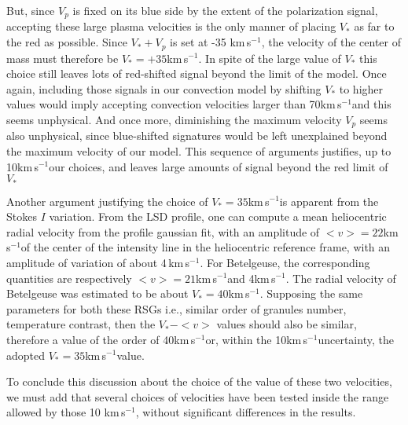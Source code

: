 \documentclass{/Users/art2/TeX/aanda/aa}
\def\kms {km\,s$^{-1}$}
\begin{document}
But, since $V_p$ is fixed on its blue side by the extent of the polarization signal, accepting these large plasma velocities is the only manner of placing $V_*$  as far to the red as possible.
Since $V_*+V_p$ is set at -35 \kms,  the velocity of the center of mass must therefore be  $V_*=+35$\kms.  
In spite of the large value of $V_*$ this choice  still leaves lots of red-shifted signal beyond the limit of the model. Once again, including those signals in our convection model by shifting $V_*$ to higher values would imply accepting convection velocities larger than 70\kms and this seems unphysical. And once more, diminishing the maximum velocity $V_p$ seems also unphysical, since blue-shifted signatures would be left unexplained beyond the maximum velocity of our model. This sequence of arguments justifies, up to 10\kms our choices, and leaves large amounts of signal beyond the red limit of $V_*$
 
 Another argument justifying the choice of  $V_*=35$\kms is apparent from  the Stokes $I$ variation.
From the LSD profile, one can compute a mean heliocentric radial velocity from the profile gaussian fit, with an amplitude of $<v>=22$\kms of the center of the intensity line in the heliocentric reference frame, with an amplitude of variation of about 4\,km\,s$^{-1}$.
For Betelgeuse, the corresponding quantities are respectively $<v>=21$\kms and 4\kms .
The radial velocity of Betelgeuse was estimated to be about $V_*=40$\kms.
Supposing the same parameters for both these RSGs i.e., similar order of granules number, temperature contrast, then the
$V_* - <v>$ values should also be similar, therefore a value of the order of 40\kms  or, within
the 10\kms uncertainty, the adopted $V_*=35$\kms value.

To conclude this discussion about the choice of the value of these two velocities, we must add that several choices of velocities have been tested inside the range allowed by those 10 \kms, without significant differences in the results. 
\end{document}
